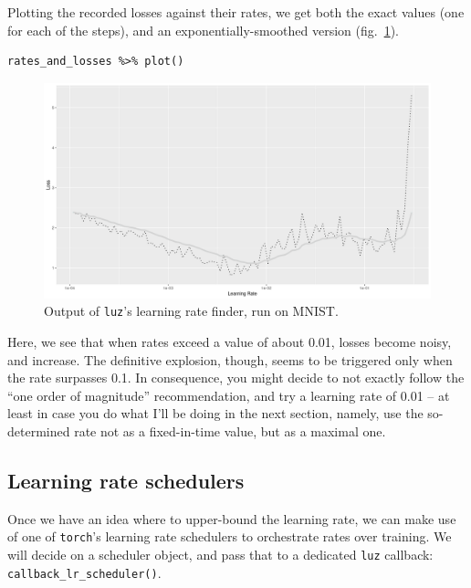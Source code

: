 \documentclass[
  letterpaper,
]{krantz}
\begin{document}
Plotting the recorded losses against their rates, we get both the exact
values (one for each of the steps), and an exponentially-smoothed
version (fig.~\ref{fig-efficiency-mnist-lr-finder}).

\begin{verbatim}
rates_and_losses %>% plot()
\end{verbatim}

\begin{figure}[H]

{\centering \includegraphics{images/efficiency-mnist-lr-finder.png}

}

\caption{\label{fig-efficiency-mnist-lr-finder}Output of \texttt{luz}'s
learning rate finder, run on MNIST.}

\end{figure}

Here, we see that when rates exceed a value of about 0.01, losses become
noisy, and increase. The definitive explosion, though, seems to be
triggered only when the rate surpasses 0.1. In consequence, you might
decide to not exactly follow the ``one order of magnitude''
recommendation, and try a learning rate of 0.01 -- at least in case you
do what I'll be doing in the next section, namely, use the so-determined
rate not as a fixed-in-time value, but as a maximal one.

\hypertarget{learning-rate-schedulers}{%
\subsection{\texorpdfstring{Learning rate
schedulers}{Learning rate schedulers}}\label{learning-rate-schedulers}}

Once we have an idea where to upper-bound the learning rate, we can make
use of one of \texttt{torch}'s learning rate schedulers to orchestrate
rates over training. We will decide on a scheduler object, and pass that
to a dedicated \texttt{luz} callback:
\texttt{callback\_lr\_scheduler()}.
\end{document}

